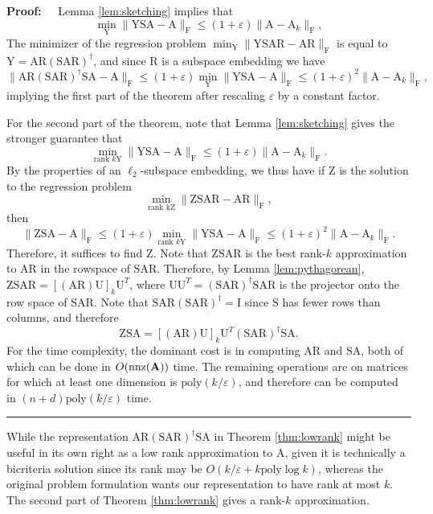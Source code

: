 \documentclass[11pt]{article}
\newcommand{\FNorm }[1]{\mbox{}\|#1\|_\mathrm{F}  }
\newenvironment{proof}{\begin{trivlist} \item {\bf Proof:~~}}
  {\qed\end{trivlist}}
\newcommand{\mat}[1]{{\ensuremath{\bm{\mathrm{#1}}}}}
\def\matA{\mat{A}}
\def\matI{\mat{I}}
\def\matR{\mat{R}}
\def\matS{\mat{S}}
\def\matU{\mat{U}}
\def\matY{\mat{Y}}
\def\matZ{\mat{Z}}
\def\nnz{{ \rm nnz }}
\def\qed{\hfill\rule{2mm}{2mm}}
\newcommand{\eps}{\varepsilon}
\newcommand{\poly}{{\mathrm{poly}}}
\begin{document}
\begin{proof}
Lemma \ref{lem:sketching} implies that 
$$\min_{\matY} \FNorm{\matY \matS \matA-\matA} \leq (1+\eps)\FNorm{\matA-\mat A_k},$$
The minimizer
of the regression problem $\min_{\mat Y} \FNorm{\matY \matS \matA \matR - \matA \matR}$ 
is equal to $\matY = \matA\matR(\matS \matA \matR)^{\dagger}$, and since $\matR$ is a subspace
embedding we have 
$$\FNorm{\matA \matR(\matS \matA \matR)^{\dagger}\matS \matA - \matA} \leq (1+\eps) \min_{\matY} \FNorm{\matY \matS \matA-\matA} 
\leq (1+\eps)^2 \FNorm{\matA-\matA_k},$$
implying the first part of the theorem after rescaling $\eps$ by a constant factor. 

For the second part of the theorem, note that Lemma \ref{lem:sketching} gives the stronger guarantee that
$$\min_{\textrm{rank }k \matY} \FNorm{\matY \matS \matA- \matA} \leq (1+\eps)\FNorm{\matA-\matA_k}.$$
By the properties of an $\ell_2$-subspace embedding, we thus have if $\matZ$ is the solution to the regression
problem
$$\min_{\textrm{rank k} \matZ} \FNorm{\matZ \matS \matA \matR- \matA \matR},$$
then 
$$\FNorm{\matZ \matS \matA- \matA} \leq (1+\eps) \min_{\textrm{rank }k \matY}\FNorm{\matY \matS \matA- \matA} 
\leq (1+\eps)^2 \FNorm{\matA- \matA_k}.$$
Therefore, it suffices to find $\matZ$. Note that $\matZ \matS \matA \matR$ is the best rank-$k$ approximation to $\matA \matR$ in the rowspace
of $\matS \matA \matR$. Therefore, by Lemma \ref{lem:pythagorean}, $\matZ \matS \matA \matR = [(\matA \matR)\matU]_k \matU^T$, where $\matU \matU^T = (\matS \matA \matR)^{\dagger} \matS \matA \matR$ is the projector onto
the row space of $\matS \matA \matR$. Note that $\matS \matA \matR (\matS \matA \matR)^{\dagger} = \matI$ since $\matS$ has fewer rows than columns, and therefore
$$\matZ \matS \matA = [(\matA \matR) \matU]_k \matU^T (\matS \matA \matR)^{\dagger} \matS \matA.$$ 
For the time complexity, the dominant cost is in computing $\matA \matR$ and $\matS \matA$, 
both of which can be done in $O(\nnz(\matA))$ time. 
The remaining operations are on matrices for which at least one dimension is $\poly(k/\eps)$, and therefore can be computed
in $(n+d)\poly(k/\eps)$ time. 
\end{proof}
While the representation $\matA \matR(\matS \matA \matR)^{\dagger}\matS \matA$ in Theorem \ref{thm:lowrank} 
might be useful in its own right as a low rank approximation to $\matA$, given
it is technically a bicriteria solution since its rank may be $O(k/\eps + k \poly \log k)$,
whereas the original problem formulation wants our representation to have rank at most $k$. 
The second part of Theorem \ref{thm:lowrank}
gives a rank-$k$ approximation. 
\end{document}

